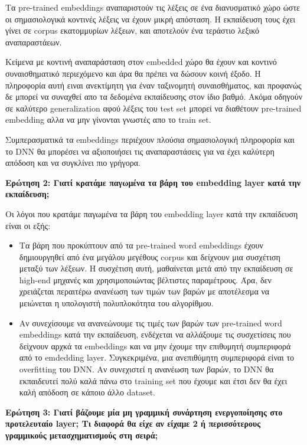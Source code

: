 \documentclass[12pt]{article}
\begin{document}
Τα pre-trained embeddings αναπαριστούν τις λέξεις σε ένα διανυσματικό χώρο ώστε οι σημασιολογικά κοντινές λέξεις να έχουν μικρή απόσταση. Η εκπαίδευση τους έχει γίνει σε corpus εκατομμυρίων λέξεων, και αποτελούν ένα τεράστιο λεξικό αναπαραστάεων. 

Κείμενα με κοντινή αναπαράσταση στον embedded χώρο θα έχουν και κοντινό συναισθηματικό περιεχόμενο και άρα θα πρέπει να δώσουν κοινή έξοδο. Η πληροφορία αυτή ειναι ανεκτίμητη για έναν ταξινομητή συναισθήματος, και προφανώς δε μπορεί να συναχθεί απο τα δεδομένα εκπαίδευσης στον ίδιο βαθμό. Ακόμα οδηγούν σε καλύτερο generalization αφού λέξεις του test set μπορεί να διαθέτουν pre-trained embedding αλλα να μην γίνονται γνωστές απο το train set. 

Συμπερασματικά τα embeddings περιέχουν πλούσια σημασιολογική πληροφορία  και το DNN θα μπορέσει να αξιοποιήσει τις αναπαραστάσεις για να έχει καλύτερη απόδοση και να συγκλίνει πιο γρήγορα. 

\textbf{Ερώτηση 2: Γιατί κρατάμε παγωμένα τα βάρη του embedding layer κατά την εκπαίδευση;}

Οι λόγοι που κρατάμε παγωμένα τα βάρη του embedding layer κατά την εκπαίδευση είναι οι εξής:

\begin{itemize}
    \item Τα βάρη που προκύπτουν από τα pre-trained word embeddings έχουν δημιουργηθεί από ένα μεγάλου μεγέθους corpus και δείχνουν μια συσχέτιση μεταξύ των λέξεων. Η συσχέτιση αυτή, μαθαίνεται μετά από την εκπαίδευση σε high-end μηχανές και χρησιμοποιώντας βέλτιστες παραμέτρους. Άρα, δεν χρειάζεται περαιτέρω ανανέωση των τιμών των βαρών με αποτέλεσμα να μειώνεται η υπολογιστή πολυπλοκότητα του αλγορίθμου.
    \item Αν συνεχίσουμε να ανανεώνουμε τις τιμές των βαρών των pre-trained word embeddings κατά την εκπαίδευση, ενδέχεται να αλλάξουμε τις συσχετίσεις που δείχνουν αρχκά τα embeddings και να μην έχουμε την επιθυμητή συμπεριφορά από το emdedding layer. Συγκεκριμένα, μια ανεπιθύμητη συμπεριφορά είναι το overfitting του DNN. Αν συνεχιστεί η ανανέωση των βαρών, το DNN θα εκπαιδευτεί πολύ καλά πάνω στο training set που έχουμε και έτσι δεν θα έχει καλή απόδοση σε κάποιο άλλο dataset.
\end{itemize}

\textbf{Ερώτηση 3: Γιατί βάζουμε μία μη γραμμική συνάρτηση ενεργοποίησης στο προτελευταίο layer; Τι διαφορά θα είχε αν είχαμε 2 ή περισσότερους γραμμικούς μετασχηματισμούς στη σειρά;}
\end{document}
